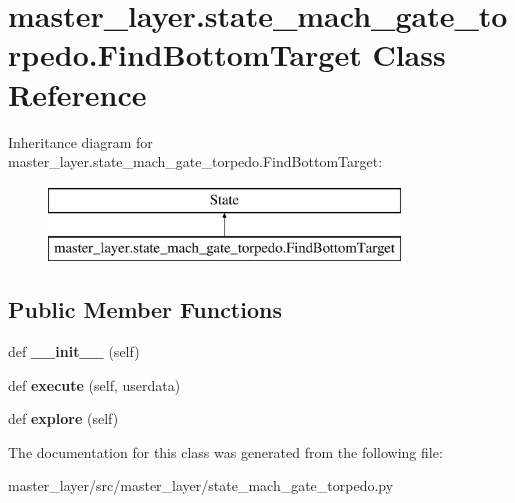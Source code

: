 \hypertarget{classmaster__layer_1_1state__mach__gate__torpedo_1_1FindBottomTarget}{}\section{master\+\_\+layer.\+state\+\_\+mach\+\_\+gate\+\_\+torpedo.\+Find\+Bottom\+Target Class Reference}
\label{classmaster__layer_1_1state__mach__gate__torpedo_1_1FindBottomTarget}
Inheritance diagram for master\+\_\+layer.\+state\+\_\+mach\+\_\+gate\+\_\+torpedo.\+Find\+Bottom\+Target\+:\begin{figure}[H]
\begin{center}
\leavevmode
\includegraphics[height=2.000000cm]{classmaster__layer_1_1state__mach__gate__torpedo_1_1FindBottomTarget}
\end{center}
\end{figure}
\subsection*{Public Member Functions}
\begin{DoxyCompactItemize}
\item 
\mbox{\label{classmaster__layer_1_1state__mach__gate__torpedo_1_1FindBottomTarget_a4c424b735499dad966149d0d4283d38c}} 
def {\bfseries \+\_\+\+\_\+init\+\_\+\+\_\+} (self)
\item 
\mbox{\label{classmaster__layer_1_1state__mach__gate__torpedo_1_1FindBottomTarget_a7f403b40fc74567ddf667ba2c896d573}} 
def {\bfseries execute} (self, userdata)
\item 
\mbox{\label{classmaster__layer_1_1state__mach__gate__torpedo_1_1FindBottomTarget_a84607cff814b0e32d122578bf00b701a}} 
def {\bfseries explore} (self)
\end{DoxyCompactItemize}


The documentation for this class was generated from the following file\+:\begin{DoxyCompactItemize}
\item 
master\+\_\+layer/src/master\+\_\+layer/state\+\_\+mach\+\_\+gate\+\_\+torpedo.\+py\end{DoxyCompactItemize}
